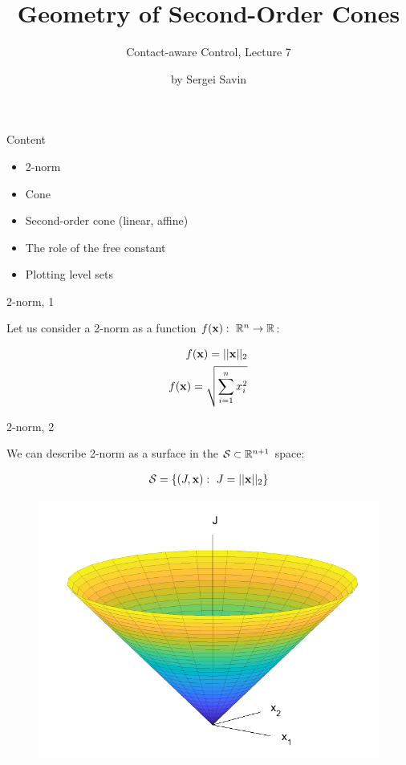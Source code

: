 \documentclass{beamer}
\title{Geometry of  Second-Order Cones}
\subtitle{Contact-aware Control, Lecture 7}
\author{by Sergei Savin}
\date{\mydate}
\begin{document}
\maketitle


\begin{frame}{Content}

\begin{itemize}
\item 2-norm
\item Cone
\item Second-order cone (linear, affine)
\item The role of the free constant
\item Plotting level sets
\end{itemize}

\end{frame}




\begin{frame}{2-norm, 1}
	\begin{flushleft}
		
		Let us consider a 2-norm as a function $f(\mathbf{x}): \ \mathbb{R}^n \rightarrow \mathbb{R}$:
		
		\begin{align}
			f(\mathbf{x}) = || \mathbf{x} ||_2
			\\
			f(\mathbf{x}) = \sqrt{ \sum_{i=1}^n x_i^2 }
		\end{align}
	
	\end{flushleft}
\end{frame}


\begin{frame}{2-norm, 2}
	\begin{flushleft}
		
		We can describe 2-norm as a surface in the $\mathcal S \subset \mathbb{R}^{n+1}$ space:
		
		\begin{align}
			\mathcal S = \{  (J, \mathbf{x}): \ J = || \mathbf{x} ||_2 \}
		\end{align}		
		
		\begin{figure}
			\centering
			\includegraphics[width=0.7\linewidth]{norm}
			\label{fig:norm}
		\end{figure}
		
	\end{flushleft}
\end{frame}
\end{document}
